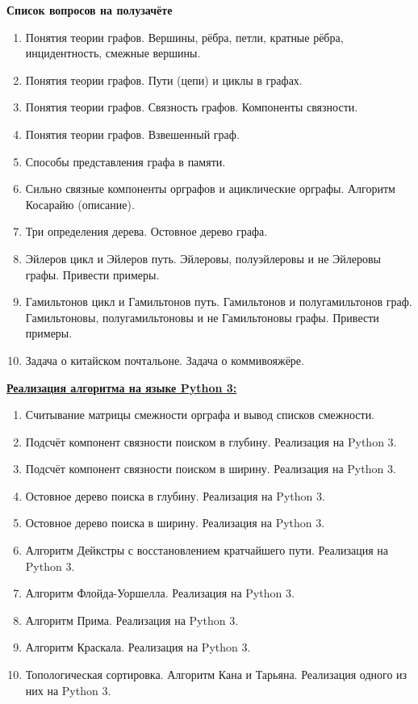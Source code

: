 \documentclass[a4paper,12pt]{article}
\theoremstyle{plain} %
\theoremstyle{definition} %
\theoremstyle{remark} %
\newcounter{num}
\begin{document}
\begin{center}
{\huge \textbf{Список вопросов на полузачёте}}
\end{center}

\begin{enumerate}
\item Понятия теории графов. Вершины, рёбра, петли, кратные рёбра, инцидентность, смежные вершины.
\item Понятия теории графов. Пути (цепи) и циклы в графах.
\item Понятия теории графов. Связность графов. Компоненты связности.
\item Понятия теории графов. Взвешенный граф.
\item Способы представления графа в памяти.
\item Сильно связные компоненты орграфов и ациклические орграфы. Алгоритм Косарайю (описание).
\item Три определения дерева. Остовное дерево графа.
\item Эйлеров цикл и Эйлеров путь. Эйлеровы, полуэйлеровы и не Эйлеровы графы. Привести примеры.
\item Гамильтонов цикл и Гамильтонов путь. Гамильтонов и полугамильтонов граф. Гамильтоновы, полугамильтоновы и не Гамильтоновы графы. Привести примеры.
\item Задача о китайском почтальоне. Задача о коммивояжёре.
\end{enumerate}
{\Large \textbf{\underline{Реализация алгоритма на языке Python 3:}}}

\begin{enumerate}
\item Считывание матрицы смежности орграфа и вывод списков смежности.
\item Подсчёт компонент связности поиском в глубину. Реализация на Python 3.
\item Подсчёт компонент связности поиском в ширину. Реализация на Python 3.
\item Остовное дерево поиска в глубину. Реализация на Python 3.
\item Остовное дерево поиска в ширину. Реализация на Python 3.
\item Алгоритм Дейкстры с восстановлением кратчайшего пути. Реализация на Python 3.
\item Алгоритм Флойда-Уоршелла. Реализация на Python 3.
\item Алгоритм Прима. Реализация на Python 3.
\item Алгоритм Краскала. Реализация на Python 3.
\item Топологическая сортировка. Алгоритм Кана и Тарьяна. Реализация одного из них на Python 3.
\end{enumerate}
\end{document}
